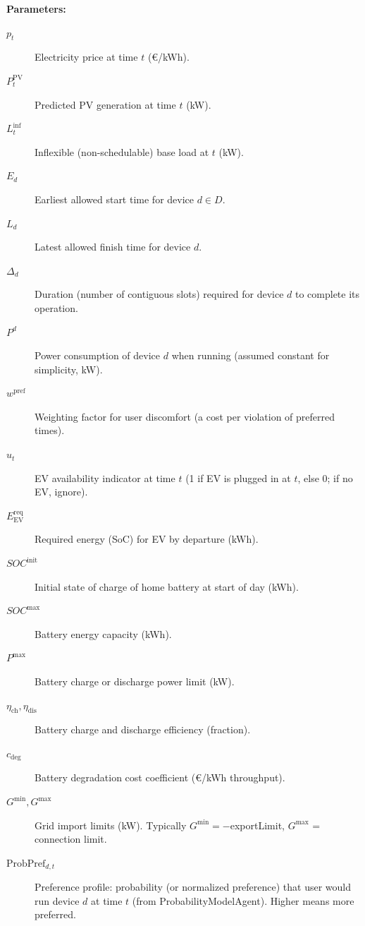 \documentclass[12pt,a4paper]{article}
\begin{document}
\textbf{Parameters:}
\begin{description}
    \item[$p_t$] Electricity price at time $t$ (€/kWh).
    \item[$P^{\text{PV}}_t$] Predicted PV generation at time $t$ (kW).
    \item[$L^{\text{inf}}_t$] Inflexible (non-schedulable) base load at $t$ (kW).
    \item[$E_d$] Earliest allowed start time for device $d \in D$.
    \item[$L_d$] Latest allowed finish time for device $d$.
    \item[$\Delta_d$] Duration (number of contiguous slots) required for device $d$ to complete its operation.
    \item[$P^d$] Power consumption of device $d$ when running (assumed constant for simplicity, kW).
    \item[$w^{\text{pref}}$] Weighting factor for user discomfort (a cost per violation of preferred times).
    \item[$u_t$] EV availability indicator at time $t$ (1 if EV is plugged in at $t$, else 0; if no EV, ignore).
    \item[$E^{\text{req}}_{\text{EV}}$] Required energy (SoC) for EV by departure (kWh).
    \item[$SOC^{\text{init}}$] Initial state of charge of home battery at start of day (kWh).
    \item[$SOC^{\text{max}}$] Battery energy capacity (kWh).
    \item[$P^{\max}$] Battery charge or discharge power limit (kW).
    \item[$\eta_{\text{ch}}, \eta_{\text{dis}}$] Battery charge and discharge efficiency (fraction).
    \item[$c_{\text{deg}}$] Battery degradation cost coefficient (€/kWh throughput).
    \item[$G^{\min}, G^{\max}$] Grid import limits (kW). Typically $G^{\min} = -$exportLimit, $G^{\max}$ = connection limit.
    \item[$\text{ProbPref}_{d,t}$] Preference profile: probability (or normalized preference) that user would run device $d$ at time $t$ (from ProbabilityModelAgent). Higher means more preferred.
\end{description}
\end{document}
